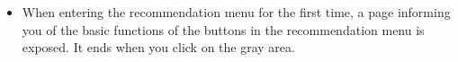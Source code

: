 \documentclass[conference]{IEEEtran}
\begin{document}
\begin{enumerate}
        \begin{itemize}
    \item[] When entering the recommendation menu for the first time, a page informing you of the basic functions of the buttons in the recommendation menu is exposed. It ends when you click on the gray area. \\\\\\\\\\\\\\\\\\\\\\\\\\
\end{itemize}

\break


\end{enumerate}
\end{document}
